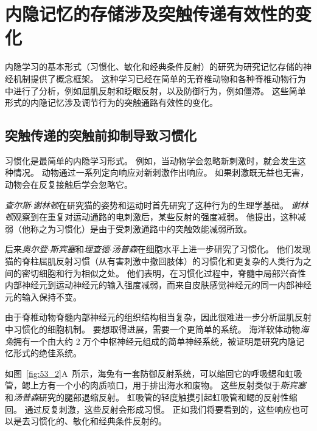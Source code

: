 \section{内隐记忆的存储涉及突触传递有效性的变化}

内隐学习的基本形式（习惯化、敏化和经典条件反射）的研究为研究记忆存储的神经机制提供了概念框架。
这种学习已经在简单的无脊椎动物和各种脊椎动物行为中进行了分析，例如屈肌反射和眨眼反射，以及防御行为，例如僵滞。
这些简单形式的内隐记忆涉及调节行为的突触通路有效性的变化。



\subsection{突触传递的突触前抑制导致习惯化}

习惯化是最简单的内隐学习形式。
例如，当动物学会忽略新刺激时，就会发生这种情况。
动物通过一系列定向响应对新刺激作出响应。
如果刺激既无益也无害，动物会在反复接触后学会忽略它。


\textit{查尔斯$\cdot$谢林顿}在研究猫的姿势和运动时首先研究了这种行为的生理学基础。
\textit{谢林顿}观察到在重复对运动通路的电刺激后，某些反射的强度减弱。
他提出，这种减弱（他称之为习惯化）是由于受刺激通路中的突触效能减弱所致。


后来\textit{奥尔登$\cdot$斯宾塞}和\textit{理查德$\cdot$汤普森}在细胞水平上进一步研究了习惯化。
他们发现猫的脊柱屈肌反射习惯（从有害刺激中撤回肢体）的习惯化和更复杂的人类行为之间的密切细胞和行为相似之处。
他们表明，在习惯化过程中，脊髓中局部兴奋性内部神经元到运动神经元的输入强度减弱，而来自皮肤感觉神经元的同一内部神经元的输入保持不变。


由于脊椎动物脊髓内部神经元的组织结构相当复杂，因此很难进一步分析屈肌反射中习惯化的细胞机制。
要想取得进展，需要一个更简单的系统。
海洋软体动物\textit{海兔}拥有一个由大约 2 万个中枢神经元组成的简单神经系统，被证明是研究内隐记忆形式的绝佳系统。


如图~\ref{fig:53_2}A~所示，海兔有一套防御反射系统，可以缩回它的呼吸鳃和虹吸管，鳃上方有一个小的肉质喷口，用于排出海水和废物。
这些反射类似于\textit{斯宾塞}和\textit{汤普森}研究的腿部退缩反射。
虹吸管的轻度触摸引起虹吸管和鳃的反射性缩回。
通过反复刺激，这些反射会形成习惯。
正如我们将要看到的，这些响应也可以是去习惯化的、敏化和经典条件反射的。


